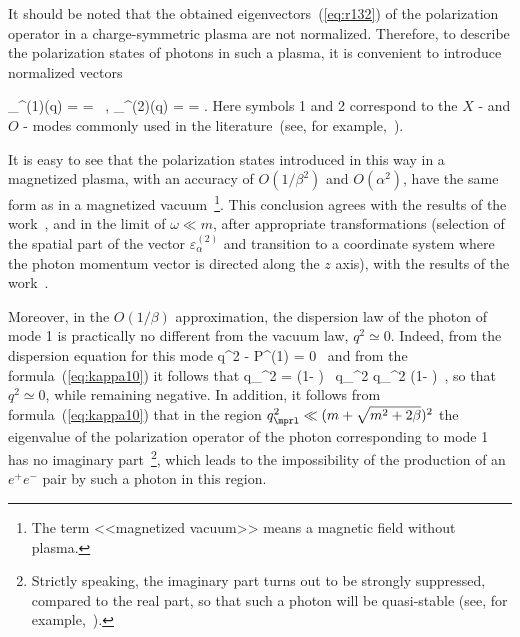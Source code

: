 \documentclass[
aps,%
12pt,%
final,%
notitlepage,%
oneside,%
onecolumn,%
nobibnotes,%
nofootinbib,%
superscriptaddress,%
noshowpacs,%
centertags]%
{revtex4}
\begin{document}
It should be noted that the obtained eigenvectors~(\ref{eq:r132}) %
of the polarization 
operator in a charge-symmetric plasma are not normalized. Therefore, to describe the polarization states of 
photons in such a plasma, it is convenient to introduce normalized vectors

%
\beq
\label{eq:epsilon}
\varepsilon_\alpha^{(1)}(q) =  = 
 \, , \quad
\varepsilon_\alpha^{(2)}(q) =  = 
.
\eeq
\noindent Here symbols 1 and 2 correspond to the
$X$ - and $O$ - modes commonly used in the literature~(see, for example,~\cite{Mushtukov2016}).

It is easy to see that the polarization states introduced in this way in a magnetized 
plasma, with an accuracy of $O(1/\beta^2)$ and $O(\alpha^2)$, have the same form as in a magnetized
vacuum~\footnote{The term <<magnetized vacuum>>
means a magnetic field without plasma.}. This conclusion agrees with the results of the 
work~\cite{Shabad1988}, and in the limit of $\omega \ll m$, after appropriate transformations 
(selection of the spatial
part of the vector $\varepsilon^{(2)}_\alpha$ and transition to a coordinate system where 
the photon momentum vector
is directed along the $z$ axis), with the results of the work~\cite{Potekhin2004}.


Moreover, in the $O(1/\beta)$ approximation, the dispersion law of the photon of mode 1 is 
practically no different from the vacuum law, $q^2 \simeq 0$. Indeed, from the dispersion equation 
for this mode
%
\beq
q^2 - {\cal P}^{(1)} = 0 \, 
\label{disper1}
\eeq
\noindent and from the formula~(\ref{eq:kappa10}) it follows that
%
\beq
q_{\mprl}^2 = \left (1- \frac{\alpha}{3\pi}  \right) \, q_{\mprp}^2  
\simeq q_{\mprp}^2 \left (1- \frac{\alpha}{3\pi} \right)\, , 
\label{disper12}
\eeq
\noindent so that $q^2 \simeq 0$,
while remaining negative. In addition, it follows from formula~(\ref{eq:kappa10}) that in
the region $q^2_{\mprl} \ll (m+\sqrt{m^2+2 \beta})^2$ the eigenvalue of the polarization
operator of the photon corresponding to mode 1 has no imaginary part~\footnote{Strictly speaking, 
the imaginary part
turns out to be strongly suppressed, compared to the real part, so that such a photon will be quasi-stable
(see, for example,~\cite{Yarkov2022}).}, which leads to the impossibility
of the production of an $e^+e^-$ pair by such a photon in this region.
\end{document}
